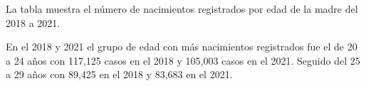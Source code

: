 La tabla muestra el número de nacimientos registrados por edad de la madre del 2018 a 2021. 

En el 2018 y 2021 el grupo de edad con más nacimientos registrados fue el de 20 a 24 años con 117,125 casos en el 2018 y 105,003 casos en el 2021. Seguido del 25 a 29 años con 89,425 en el 2018 y 83,683 en el 2021.   
